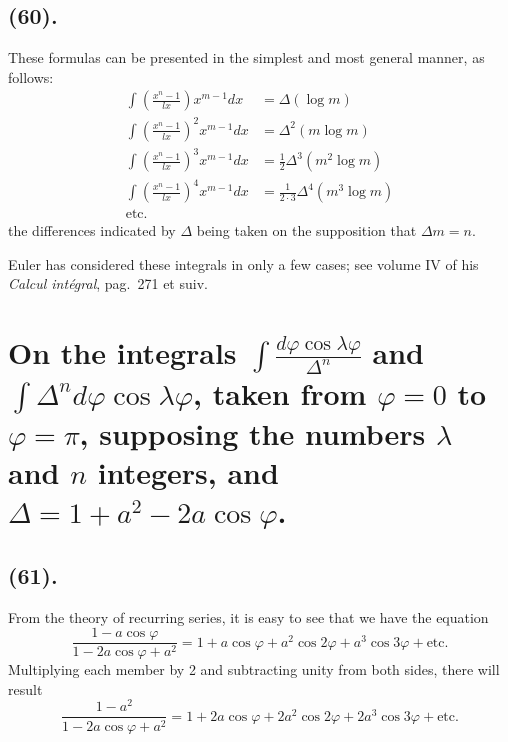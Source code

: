 \documentclass{article}
\begin{document}
\subsection*{(60).}

These formulas can be presented in the simplest and most general manner, as follows:
\[ \begin{aligned} \int\left(\frac{x^{n}-1}{lx}\right)x^{m-1}dx&=\Delta(\log m)\\ \int\left(\frac{x^{n}-1}{lx}\right)^{2}x^{m-1}dx&=\Delta^{2}(m\log m)\\ \int\left(\frac{x^{n}-1}{lx}\right)^{3}x^{m-1}dx&=\frac{1}{2}\Delta^{3}(m^{2}\log m)\\ \int\left(\frac{x^{n}-1}{lx}\right)^{4}x^{m-1}dx&=\frac{1}{2\cdot3}\Delta^{4}(m^{3}\log m)\\ \text{etc.}\qquad& \end{aligned} \]
the differences indicated by $\Delta$ being taken on the supposition that $\Delta m=n$.

Euler has considered these integrals in only a few cases; see volume IV of his \emph{Calcul intégral}, pag.~271 et suiv.

\section*{On the integrals $\displaystyle\int\frac{d\varphi\cos\lambda\varphi}{\Delta^{n}}$ and $\displaystyle\int\Delta^{n}d\varphi\cos\lambda\varphi$, taken from $\varphi=0$ to $\varphi=\pi$, supposing the numbers $\lambda$ and $n$ integers, and $\Delta=1+a^{2}-2a\cos\varphi$.}

\subsection*{(61).}

From the theory of recurring series, it is easy to see that we have the equation
\[ \frac{1-a\cos\varphi}{1-2a\cos\varphi+a^{2}}=1+a\cos\varphi+a^{2}\cos2\varphi+a^{3}\cos3\varphi+\text{etc.} \]
Multiplying each member by 2 and subtracting unity from both sides, there will result
\[ \frac{1-a^{2}}{1-2a\cos\varphi+a^{2}}=1+2a\cos\varphi+2a^{2}\cos2\varphi+2a^{3}\cos3\varphi+\text{etc.} \]
\end{document}
